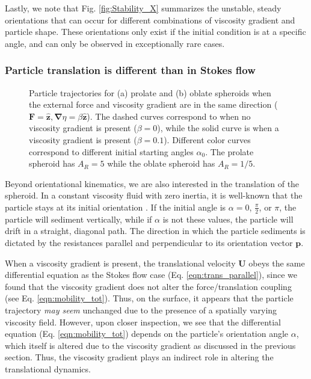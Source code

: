 \documentclass{jfm}
\begin{document}
Lastly, we note that Fig. \ref{fig:Stability_X}  summarizes the unstable, steady orientations that can occur for different combinations of viscosity gradient and particle shape.  These orientations only exist if the initial condition is at a specific angle, and can only be observed in exceptionally rare cases.

\subsubsection{Particle translation is different than in Stokes flow}

\begin{figure}
\centering
{}

\caption{Particle trajectories for (a) prolate and (b) oblate spheroids when the external force and viscosity gradient are in the same direction ($\boldsymbol{F} = \boldsymbol{\hat{z}}, \boldsymbol{\nabla}\eta = \beta \boldsymbol{\hat{z}}$). The dashed curves correspond to when no viscosity gradient is present ($\beta = 0$), while the solid curve is when a viscosity gradient is present ($\beta = 0.1$). Different color curves correspond to different initial starting angles $\alpha_0$.  The prolate spheroid has $A_R = 5$ while the oblate spheroid has $A_R = 1/5$.}
\label{fig:Translation}
\end{figure}

Beyond orientational kinematics, we are also interested in the translation of the spheroid.  In a constant viscosity fluid with zero inertia, it is well-known that the particle stays at its initial orientation \citep{Leal2007}.  If the initial angle is $\alpha = 0$, $\frac{\pi}{2}$, or $\pi$, the particle will sediment vertically, while if $\alpha$ is not these values, the particle will drift in a straight, diagonal path.  The direction in which the particle sediments is dictated by the resistances parallel and perpendicular to its orientation vector $\boldsymbol{p}$.

When a viscosity gradient is present, the translational velocity $\boldsymbol{U}$ obeys the same differential equation as the Stokes flow case (Eq. \eqref{eqn:trans_parallel}), since we found that the viscosity gradient does not alter the force/translation coupling (see Eq. \eqref{eqn:mobility_tot}).  Thus, on the surface, it appears that the particle trajectory \textit{may seem} unchanged due to the presence of a spatially varying viscosity field.  However, upon closer inspection, we see that the differential equation (Eq. \eqref{eqn:mobility_tot}) depends on the particle’s orientation angle $\alpha$, which itself is altered due to the viscosity gradient as discussed in the previous section.  Thus, the viscosity gradient plays an indirect role in altering the translational dynamics.
\end{document}
